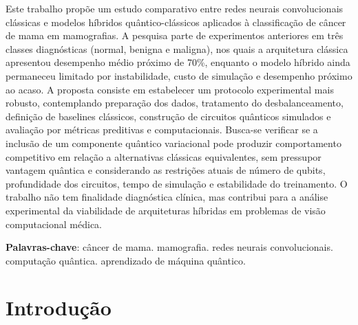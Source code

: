 \documentclass[
    12pt,
    openright,
    oneside,
    a4paper,
    english,
    brazil
]{abntex2}
\begin{document}
\frenchspacing

\pretextual
\imprimircapa
\imprimirfolhaderosto

\begin{resumo}

Este trabalho propõe um estudo comparativo entre redes neurais convolucionais clássicas e modelos híbridos quântico-clássicos aplicados à classificação de câncer de mama em mamografias. A pesquisa parte de experimentos anteriores em três classes diagnósticas (normal, benigna e maligna), nos quais a arquitetura clássica apresentou desempenho médio próximo de 70\%, enquanto o modelo híbrido ainda permaneceu limitado por instabilidade, custo de simulação e desempenho próximo ao acaso. A proposta consiste em estabelecer um protocolo experimental mais robusto, contemplando preparação dos dados, tratamento do desbalanceamento, definição de baselines clássicos, construção de circuitos quânticos simulados e avaliação por métricas preditivas e computacionais. Busca-se verificar se a inclusão de um componente quântico variacional pode produzir comportamento competitivo em relação a alternativas clássicas equivalentes, sem pressupor vantagem quântica e considerando as restrições atuais de número de qubits, profundidade dos circuitos, tempo de simulação e estabilidade do treinamento. O trabalho não tem finalidade diagnóstica clínica, mas contribui para a análise experimental da viabilidade de arquiteturas híbridas em problemas de visão computacional médica.

\vspace{\onelineskip}
\noindent
\textbf{Palavras-chave}: câncer de mama. mamografia. redes neurais convolucionais. computação quântica. aprendizado de máquina quântico.
\end{resumo}

\tableofcontents*
\cleardoublepage

\textual



\chapter{Introdução}
\end{document}
